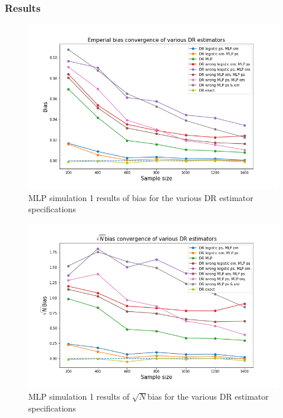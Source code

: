 \documentclass[12pt,twoside]{article}
\begin{document}
\subsubsection*{Results}

\begin{figure}[h!]
    \centering
    \includegraphics[width = 0.9\columnwidth]{figures/biasMLP.png}
    \caption{MLP simulation 1 results of bias for the various DR estimator specifications}
    \label{figbiasMLP}
\end{figure}

\begin{figure}[h!]
    \centering
    \includegraphics[width = 0.9\columnwidth]{figures/sqrtnMLP.png}
    \caption{MLP simulation 1 results of $\sqrt{N}$bias for the various DR estimator specifications}
    \label{figsqrtnMLP}
\end{figure}
\end{document}

